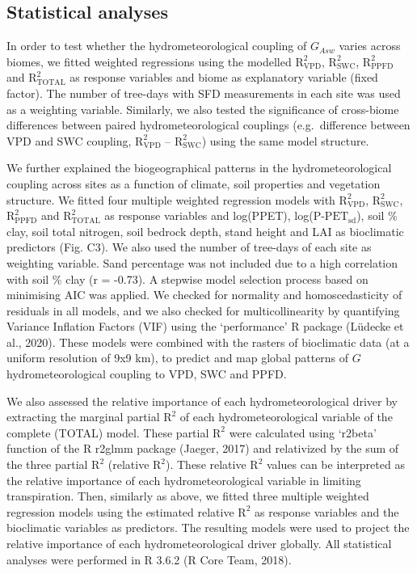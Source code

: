 \documentclass[11pt,twoside]{reedthesis}
\begin{document}
\subsection{Statistical analyses}\label{statistical-analyses}

In order to test whether the hydrometeorological coupling of \(G_{Asw}\)
varies across biomes, we fitted weighted regressions using the modelled
\(\text{R}^2_{\text{VPD}}\), \(\text{R}^2_{\text{SWC}}\),
\(\text{R}^2_{\text{PPFD}}\) and \(\text{R}^2_{\text{TOTAL}}\) as
response variables and biome as explanatory variable (fixed factor). The
number of tree-days with SFD measurements in each site was used as a
weighting variable. Similarly, we also tested the significance of
cross-biome differences between paired hydrometeorological couplings
(e.g.~difference between VPD and SWC coupling,
\(\text{R}^2_{\text{VPD}}\) -- \(\text{R}^2_{\text{SWC}}\)) using the
same model structure.\par

We further explained the biogeographical patterns in the
hydrometeorological coupling across sites as a function of climate, soil
properties and vegetation structure. We fitted four multiple weighted
regression models with \(\text{R}^2_{\text{VPD}}\),
\(\text{R}^2_{\text{SWC}}\), \(\text{R}^2_{\text{PPFD}}\) and
\(\text{R}^2_{\text{TOTAL}}\) as response variables and log(PPET),
log(\(\text{P-PET}_{\text{sd}}\)), soil \% clay, soil total nitrogen,
soil bedrock depth, stand height and LAI as bioclimatic predictors (Fig.
C3). We also used the number of tree-days of each site as weighting
variable. Sand percentage was not included due to a high correlation
with soil \% clay (r = -0.73). A stepwise model selection process based
on minimising AIC was applied. We checked for normality and
homoscedasticity of residuals in all models, and we also checked for
multicollinearity by quantifying Variance Inflation Factors (VIF) using
the `performance' R package (Lüdecke et al., 2020). These models were
combined with the rasters of bioclimatic data (at a uniform resolution
of 9x9 km), to predict and map global patterns of \(G\)
hydrometeorological coupling to VPD, SWC and PPFD.\par

We also assessed the relative importance of each hydrometeorological
driver by extracting the marginal partial \(\text{R}^2\) of each
hydrometeorological variable of the complete (TOTAL) model. These
partial \(\text{R}^2\) were calculated using `r2beta' function of the R
r2glmm package (Jaeger, 2017) and relativized by the sum of the three
partial \(\text{R}^2\) (relative \(\text{R}^2\)). These relative
\(\text{R}^2\) values can be interpreted as the relative importance of
each hydrometeorological variable in limiting transpiration. Then,
similarly as above, we fitted three multiple weighted regression models
using the estimated relative \(\text{R}^2\) as response variables and
the bioclimatic variables as predictors. The resulting models were used
to project the relative importance of each hydrometeorological driver
globally. All statistical analyses were performed in R 3.6.2 (R Core
Team, 2018).\par
\end{document}
